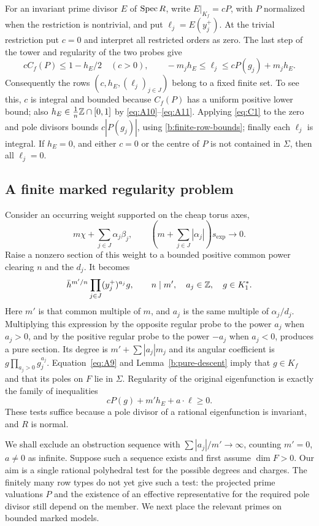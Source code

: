 For an invariant prime divisor \(E\) of \(\operatorname{Spec} R\), write
\(E|_{K_f}=cP\), with \(P\) normalized when the restriction is nontrivial,
and put \(\ell_j=E(y_j^+)\). At the trivial restriction put \(c=0\) and
interpret all restricted orders as zero. The last step of the tower and
regularity of the two probes give
\begin{equation}\label{b:finite-row-bounds}
 cC_f(P)\leq1-h_E/2\quad(c>0),\qquad
 -m_jh_E\leq\ell_j\leq cP(g_j)+m_jh_E.
\end{equation}
Consequently the rows \((c,h_E,(\ell_j)_{j\in J})\) belong to a fixed
finite set. To see this, \(c\) is integral and bounded because
\(C_f(P)\) has a uniform positive lower bound; also
\(h_E\in\frac1n\mathbb Z\cap[0,1]\) by \eqref{eq:A10}--\eqref{eq:A11}.
Applying \eqref{eq:C1} to the zero and pole divisors bounds
\(c|P(g_j)|\), using \eqref{b:finite-row-bounds}; finally each \(\ell_j\)
is integral. If \(h_E=0\), and either \(c=0\) or the centre of \(P\) is
not contained in \(\Sigma\), then all \(\ell_j=0\).

\subsection{A finite marked regularity problem}
Consider an occurring weight supported on the cheap torus axes,
\[
 m\chi+\sum_{j\in J}\alpha_j\beta_j,\qquad
 \left(m+\sum_{j\in J}|\alpha_j|\right)s_{\exp}\longrightarrow0.
\]
Raise a nonzero section of this weight to a bounded positive common power
clearing \(n\) and the \(d_j\). It becomes
\[
 \bar h^{m'/n}\prod_{j\in J}(y_j^+)^{a_j}g,
 \qquad n\mid m',\quad a_j\in\mathbb Z,\quad g\in K_1^*.
\]
Here \(m'\) is that common multiple of \(m\), and \(a_j\) is the same
multiple of \(\alpha_j/d_j\). Multiplying this expression by the opposite
regular probe to the power \(a_j\) when \(a_j>0\), and by the positive
regular probe to the power \(-a_j\) when \(a_j<0\), produces a pure section.
Its degree is \(m'+\sum|a_j|m_j\) and its angular coefficient is
\(g\prod_{a_j>0}g_j^{a_j}\). Equation~\eqref{eq:A9} and
Lemma~\ref{b:pure-descent} imply that \(g\in K_f\) and that its poles on
\(F\) lie in \(\Sigma\). Regularity of the original eigenfunction is
exactly the family of inequalities
\begin{equation}\label{eq:D1}
 cP(g)+m'h_E+a\cdot\ell\geq0.
\end{equation}
These tests suffice because a pole divisor of a rational eigenfunction is
invariant, and \(R\) is normal.

We shall exclude an obstruction sequence with
\(\sum|a_j|/m'\to\infty\), counting \(m'=0\), \(a\ne0\) as infinite.
Suppose such a sequence exists and first assume \(\dim F>0\).
Our aim is a single rational polyhedral test for the possible degrees
and charges. The finitely many row types do not yet give such a test:
the projected prime valuations \(P\) and the existence of an effective
representative for the required pole divisor still depend on the
member. We next place the relevant primes on bounded marked models.

